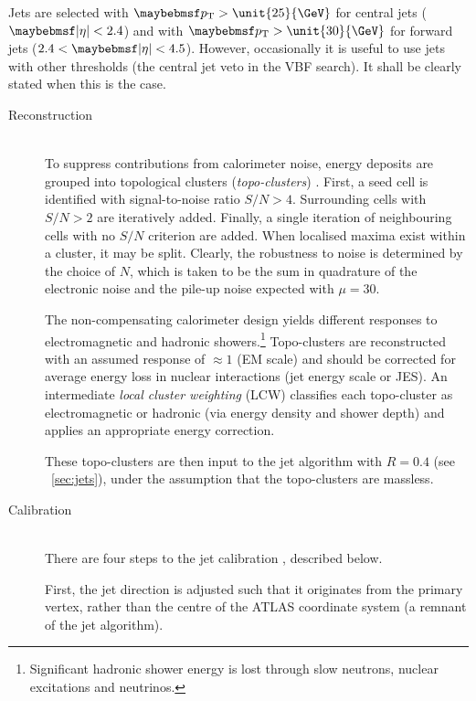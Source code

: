 Jets are selected with $\pt > \unit{25}{\GeV}$ for central jets ($\mods{\eta} < 2.4$) and 
with $\pt > \unit{30}{\GeV}$ for forward jets ($2.4 < \mods{\eta} < 4.5$). However, 
occasionally it is useful to use jets with other \pt thresholds (\eg the central jet 
veto in the VBF search). It shall be clearly stated when this is the case.

\begin{description}
\item[Reconstruction] \hfill \\
	To suppress contributions from calorimeter noise, energy deposits are grouped into 
	topological clusters (\textit{topo-clusters}) \cite{Jets:Calib:2010,Jets:Calib:2011}. 
	First, a seed cell is identified with signal-to-noise ratio $S/N > 4$. Surrounding 
	cells with $S/N > 2$ are iteratively added. Finally, a single iteration of 
	neighbouring cells with no $S/N$ criterion are added. When localised maxima exist within 
	a cluster, it may be split. Clearly, the robustness to noise is determined by the 
	choice of $N$, which is taken to be the sum in quadrature of the electronic noise and 
	the pile-up noise expected with $\mu = 30$.

	The non-compensating calorimeter design yields different responses to electromagnetic 
	and hadronic showers.\footnote{
		Significant hadronic shower energy is lost through slow neutrons, nuclear 
		excitations and neutrinos.
	}
	Topo-clusters are reconstructed with an assumed response of $\approx\!1$ (EM scale) and 
	should be corrected for average energy loss in nuclear interactions (jet energy scale 
	or JES). An intermediate \textit{local cluster weighting} (LCW) 
	classifies each topo-cluster as electromagnetic or hadronic (via energy density and 
	shower depth) and applies an appropriate energy correction.
	
	These topo-clusters are then input to the \antikt jet algorithm with $R = 0.4$ (see 
	\Section~\ref{sec:jets}), under the assumption that the topo-clusters are massless.

\item[Calibration] \hfill \\
	There are four steps to the jet calibration \cite{Jets:Calib:2011}, described below.

	First, the jet direction is adjusted such that it originates from the primary vertex, 
	rather than the centre of the ATLAS coordinate system (a remnant of the jet 
	algorithm).


\end{description}
